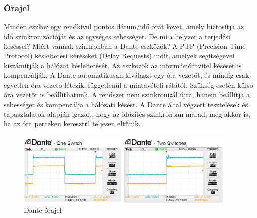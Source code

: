 \subsubsection{Órajel}
Minden eszköz egy rendkívül pontos dátum/idő órát követ, amely biztosítja az 
idő szinkronizációját és az egységes sebességet. De mi a helyzet a terjedési 
késéssel? Miért vannak szinkronban a Dante eszközök? A PTP (Precision Time Protocol) 
késleltetési kéréseket (Delay Requests) indít, amelyek segítségével kiszámítják 
a hálózat késleltetését. Az eszközök az információátvitel késését is kompenzálják. 
A Dante automatikusan kiválaszt egy óra vezetőt, és mindig csak egyetlen óra 
vezető létezik, függetlenül a mintavételi rátától. Szükség esetén külső óra 
vezetőt is beállíthatunk. A rendszer nem szinkronizál újra, hanem beállítja 
a sebességet és kompenzálja a hálózati késést. A Dante által végzett tesztelések 
és tapasztalatok alapján igazolt, hogy az időzítés szinkronban marad, még akkor 
is, ha az óra perceken keresztül teljesen eltűnik.
\begin{figure}[H]
	\centering
	\includegraphics[width=400px, keepaspectratio] {figures/dante-clocking.jpg}
	\caption{Dante órajel}
	\label{fig:dante-clock}
\end{figure}
